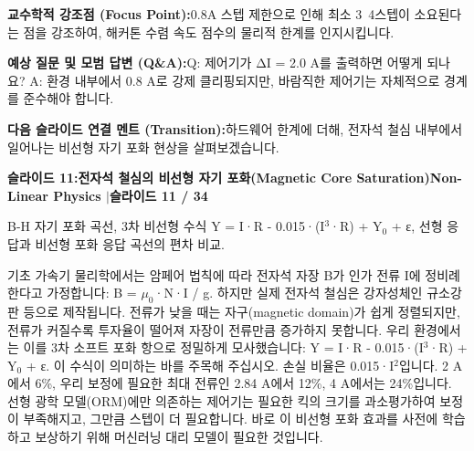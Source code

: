 \documentclass[11pt,a4paper]{article}
\begin{document}
\begin{tcolorbox}[colback=lightbg,colframe=bordergray,left=6pt,right=6pt,top=3pt,bottom=3pt,boxrule=0.6pt,arc=2.5pt]
\small
\noindent\textbf{\color{navy}교수학적 강조점 (Focus Point):}\enspace 0.8A 스텝 제한으로 인해 최소 3~4스텝이 소요된다는 점을 강조하여, 해커톤 수렴 속도 점수의 물리적 한계를 인지시킵니다.\par\vspace{0.3em}
\noindent\textbf{\color{successgreen}예상 질문 및 모범 답변 (Q\&A):}\enspace Q: 제어기가 ΔI = 2.0 A를 출력하면 어떻게 되나요? A: 환경 내부에서 0.8 A로 강제 클리핑되지만, 바람직한 제어기는 자체적으로 경계를 준수해야 합니다.\par\vspace{0.3em}
\noindent\textbf{\color{accent}다음 슬라이드 연결 멘트 (Transition):}\enspace 하드웨어 한계에 더해, 전자석 철심 내부에서 일어나는 비선형 자기 포화 현상을 살펴보겠습니다.
\end{tcolorbox}
\clearpage
\hypertarget{slide.11}{}
{}
\noindent\begin{tcolorbox}[colback=navy,colframe=navy,left=6pt,right=6pt,top=3pt,bottom=3pt,boxrule=0pt,arc=2pt]
{\large\bfseries\color{white}슬라이드 11:\enspace 전자석 철심의 비선형 자기 포화(Magnetic Core Saturation)}\hfill{\footnotesize\bfseries\color{white!85!lightbg}Non-Linear Physics \enspace$|$\enspace 슬라이드 11 / 34}
\end{tcolorbox}
\vspace{0.2em}
\begin{tcolorbox}[colback=lightbg,colframe=bordergray,title={\footnotesize\bfseries\color{darkgray}슬라이드 시각 구성 요약},fontupper=\small,left=6pt,right=6pt,top=2.5pt,bottom=2.5pt,boxrule=0.6pt,arc=2.5pt]
B-H 자기 포화 곡선, 3차 비선형 수식 Y = I·R - 0.015·(I$^3$·R) + Y$_0$ + ε, 선형 응답과 비선형 포화 응답 곡선의 편차 비교.
\end{tcolorbox}
\vspace{0.2em}
\begin{tcolorbox}[colback=white,colframe=primaryblue,title={\footnotesize\bfseries\color{white}발표자 구두 대본 (Spoken Script)},fontupper=\small,left=6pt,right=6pt,top=3pt,bottom=3pt,boxrule=0.8pt,arc=2.5pt]
기초 가속기 물리학에서는 암페어 법칙에 따라 전자석 자장 B가 인가 전류 I에 정비례한다고 가정합니다: B = $\mu_0$·N·I / g. 하지만 실제 전자석 철심은 강자성체인 규소강판 등으로 제작됩니다. 전류가 낮을 때는 자구(magnetic domain)가 쉽게 정렬되지만, 전류가 커질수록 투자율이 떨어져 자장이 전류만큼 증가하지 못합니다. 우리 환경에서는 이를 3차 소프트 포화 항으로 정밀하게 모사했습니다: Y = I·R - 0.015·(I$^3$·R) + Y$_0$ + ε. 이 수식이 의미하는 바를 주목해 주십시오. 손실 비율은 0.015·I$^2$입니다. 2 A에서 6\%, 우리 보정에 필요한 최대 전류인 2.84 A에서 12\%, 4 A에서는 24\%입니다. 선형 광학 모델(ORM)에만 의존하는 제어기는 필요한 킥의 크기를 과소평가하여 보정이 부족해지고, 그만큼 스텝이 더 필요합니다. 바로 이 비선형 포화 효과를 사전에 학습하고 보상하기 위해 머신러닝 대리 모델이 필요한 것입니다.
\end{tcolorbox}
\end{document}
